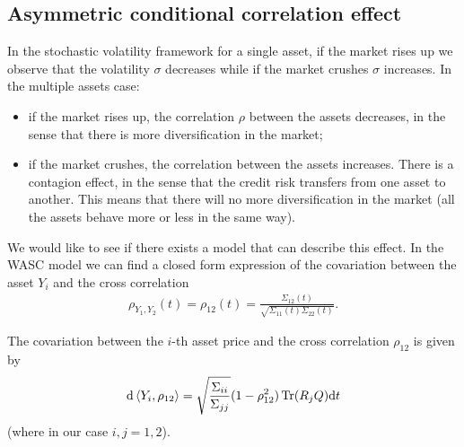 \subsection{Asymmetric conditional correlation effect}
In the stochastic volatility framework for a single asset, if the market rises up we observe that the volatility $\sigma$ decreases while if the market crushes $\sigma$ increases. In the multiple assets case:
\begin{itemize}
    \item if the market rises up, the correlation $\rho$ between the assets decreases, in the sense that there is more diversification in the market;
    \item if the market crushes, the correlation between the assets increases. There is a contagion effect, in the sense that the credit risk transfers from one asset to another. This means that there will no more diversification in the market (all the assets behave more or less in the same way).
\end{itemize}
We would like to see if there exists a model that can describe this effect. In the WASC model we can find a closed form expression of the covariation between the asset $Y_i$ and the cross correlation
\begin{align}
    \rho_{Y_1,Y_2}(t) = \rho_{12}(t) = \frac{\Sigma_{12}(t)}{\sqrt{\Sigma_{11}(t)\Sigma_{22}(t)}}.
\end{align}
\begin{proposition}
    The covariation between the $i$-th asset price and the cross correlation $\rho_{12}$ is given by
    \begin{align}
        \dd\expval{Y_i,\rho_{12}} = \sqrt{\frac{\Sigma_{ii}}{\Sigma_{jj}}}(1-\rho_{12}^2)\Tr(R_jQ)\dd t
    \end{align}
    (where in our case $i,j=1,2$).
\end{proposition}
